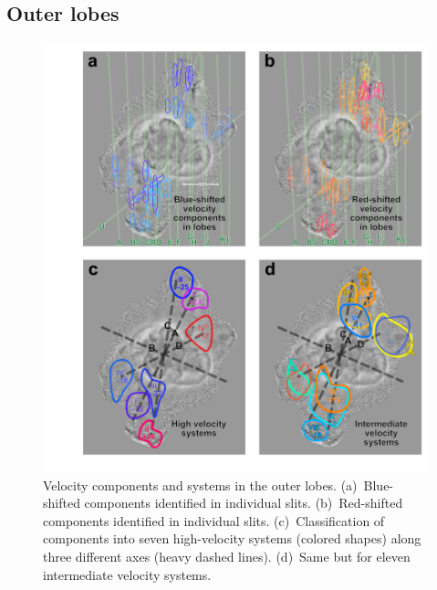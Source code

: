 \documentclass[useAMS, usenatbib]{mnras}
\begin{document}
\subsection{Outer lobes}
\label{sec:outer-lobes}

\begin{figure}
  \centering
  \includegraphics[width=\linewidth]{figs/turtle-lobes-simplified}
  \caption{
    Velocity components and systems in the outer lobes.
    (a)~Blue-shifted components identified in individual slits.
    (b)~Red-shifted components identified in individual slits.
    (c)~Classification of components into seven high-velocity systems (colored shapes)
    along three different axes (heavy dashed lines).
    (d)~Same but for eleven intermediate velocity systems.
  }
  \label{fig:outer-lobe-components}
\end{figure}
\newcommand\Sys[1]{%
  \setcounter{Syscounter}{#1}%
  \ensuremath{\mathrm{\Roman{Syscounter}}}%
}
\newcommand\SysP[1]{\ensuremath{\Sys{#1}^+}}
\newcommand\SysM[1]{\ensuremath{\Sys{#1}^-}}
\end{document}
